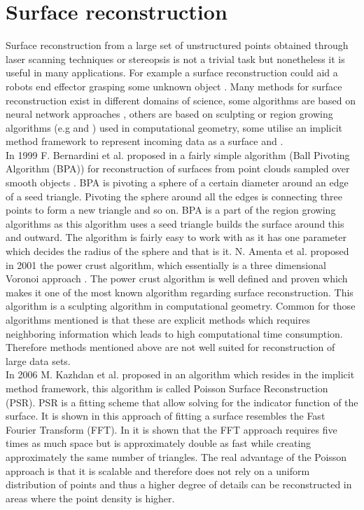 \section{Surface reconstruction}
Surface reconstruction from a large set of unstructured points obtained through laser scanning techniques or stereopsis is not a trivial task but nonetheless it is useful in many applications. For example a surface reconstruction could aid a robots end effector grasping some unknown object \cite{Wang2005}. Many methods for surface reconstruction exist in different domains of science, some algorithms are based on neural network approaches  \cite{Wu2007}, others are based on sculpting or region growing algorithms (e.g \cite{Bernardini1999} and \cite{Amenta2001}) used in computational geometry, some utilise an implicit method framework to represent incoming data as a surface \cite{Kazhdan2006} and \cite{Dong2011}.\\
In 1999 F. Bernardini et al. proposed in a fairly simple algorithm (Ball Pivoting Algorithm (BPA)) for reconstruction of surfaces from point clouds sampled over smooth objects \cite{Bernardini1999}. BPA is pivoting a sphere of a certain diameter around an edge of a seed triangle. Pivoting the sphere around all the edges is connecting three points to form a new triangle and so on. BPA is a part of the region growing algorithms as this algorithm uses a seed triangle builds the surface around this and outward. The algorithm is fairly easy to work with as it has one parameter which decides the radius of the sphere and that is it. N. Amenta et al. proposed in 2001 \cite{Amenta2001} the power crust algorithm, which essentially is a three dimensional Voronoi approach \cite{Ledoux2007}. The power crust algorithm is well defined and proven which makes it one of the most known algorithm regarding surface reconstruction. This algorithm is a sculpting algorithm in computational geometry. Common for those algorithms mentioned is that these are explicit methods which requires neighboring information which leads to high computational time consumption. Therefore methods mentioned above are not well suited for reconstruction of large data sets.\\
In 2006 M. Kazhdan et al. proposed in \cite{Kazhdan2006} an algorithm which resides in the implicit method framework, this algorithm is called Poisson Surface Reconstruction (PSR). PSR is a fitting scheme that allow solving for the indicator function of the surface. It is shown in \cite{Kazhdan2006} this approach of fitting a surface resembles the Fast Fourier Transform (FFT). In \cite{Kazhdan2006} it is shown that the FFT approach requires five times as much space but is approximately double as fast while creating approximately the same number of triangles. The real advantage of the Poisson approach is that it is scalable and therefore does not rely on a uniform distribution of points and thus a higher degree of details can be reconstructed in areas where the point density is higher.\\
